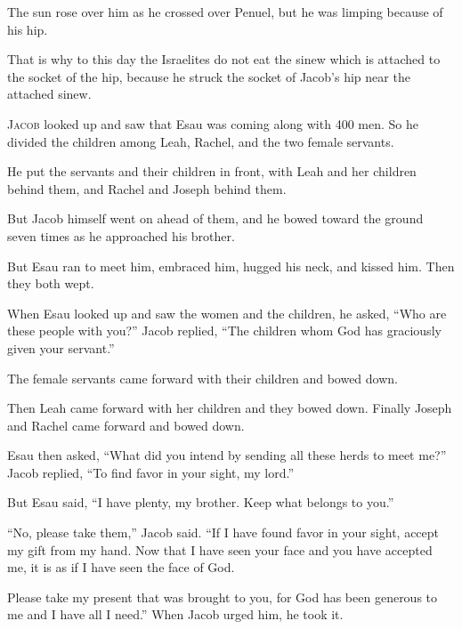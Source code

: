 \begin{scripture}
 The sun rose over him as he crossed over Penuel, but he was limping because of his hip.
 That is why to this day the Israelites do not eat the sinew which is attached to the socket of the hip, because he struck the socket of Jacob's hip near the attached sinew.

 \allowchapbreak\hypertarget{ch-genesis-33}{}\lettrine[lines=5]{\color{pentateuch}J}{\textsc{acob}} looked up and saw that Esau was coming along with 400 men. So he divided the children among Leah, Rachel, and the two female servants.\everypar{}
 He put the servants and their children in front, with Leah and her children behind them, and Rachel and Joseph behind them.
 But Jacob himself went on ahead of them, and he bowed toward the ground seven times as he approached his brother.
 But Esau ran to meet him, embraced him, hugged his neck, and kissed him. Then they both wept.
 When Esau looked up and saw the women and the children, he asked, ``Who are these people with you?'' Jacob replied, ``The children whom God has graciously given your servant.''
 The female servants came forward with their children and bowed down.
 Then Leah came forward with her children and they bowed down. Finally Joseph and Rachel came forward and bowed down.
\everypar{}

 Esau then asked, ``What did you intend by sending all these herds to meet me?'' Jacob replied, ``To find favor in your sight, my lord.''
 But Esau said, ``I have plenty, my brother. Keep what belongs to you.''
 ``No, please take them,'' Jacob said. ``If I have found favor in your sight, accept my gift from my hand. Now that I have seen your face and you have accepted me, it is as if I have seen the face of God.
 Please take my present that was brought to you, for God has been generous to me and I have all I need.'' When Jacob urged him, he took it.
\everypar{}


\end{scripture}
